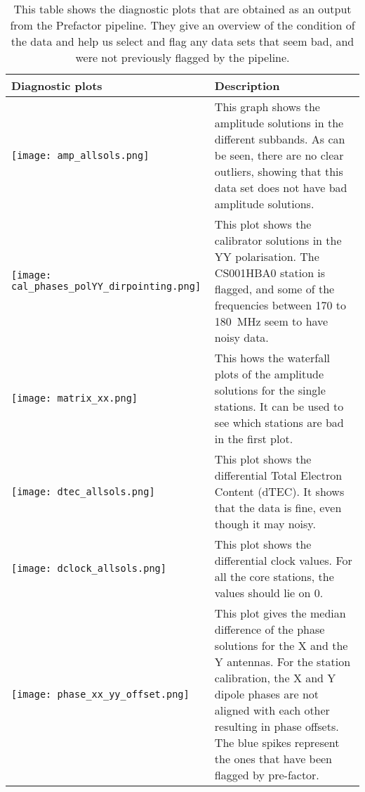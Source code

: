 \documentclass[../main/thesis_msc.tex]{subfiles}
\begin{document}
\begin{table}[ht] 
\centering 
\begin{tabular}{m{4.5cm}|m{8cm} }      %
\hline\hline                                      %
Diagnostic plots  & Description \\ [0.5ex] %
\midrule\addlinespace[1.5ex]
         \texttt{[image: amp\_allsols.png]}
         & This graph shows the amplitude solutions in the different subbands. As can be seen, there are no clear outliers, showing that this data set does not have bad amplitude solutions. \\ [1ex]
\midrule\addlinespace[1.5ex] 
		 \texttt{[image: cal\_phases\_polYY\_dirpointing.png]}
		 &  This plot shows the calibrator solutions in the YY polarisation. The CS001HBA0 station is flagged, and some of the frequencies between 170 to 180~MHz seem to have noisy data. \\
\midrule\addlinespace[1.5ex]
         \texttt{[image: matrix\_xx.png]}
         & This hows the waterfall plots of the amplitude solutions for the single stations. It can be used to see which stations are bad in the first plot.\\
\midrule\addlinespace[1.5ex]
         \texttt{[image: dtec\_allsols.png]}
         & This plot shows the differential Total Electron Content (dTEC). It shows that the data is fine, even though it may noisy.\\
\midrule\addlinespace[1.5ex]
         \texttt{[image: dclock\_allsols.png]}
         & This plot shows the differential clock values. For all the core stations, the values should lie on 0.\\
\midrule\addlinespace[1.5ex]
		 \texttt{[image: phase\_xx\_yy\_offset.png]}
		 & This plot gives the median difference of the phase solutions for the X and the Y antennas. For the station calibration, the X and Y dipole phases are not aligned with each other resulting in phase offsets. The blue spikes represent the ones that have been flagged by pre-factor.\\
\end{tabular}
\caption{This table shows the diagnostic plots that are obtained as an output from the Prefactor pipeline. They give an overview of the condition of the data and help us select and flag any data sets that seem bad, and were not previously flagged by the pipeline.}
\label{diagnostic}    
\end{table}
\end{document}

